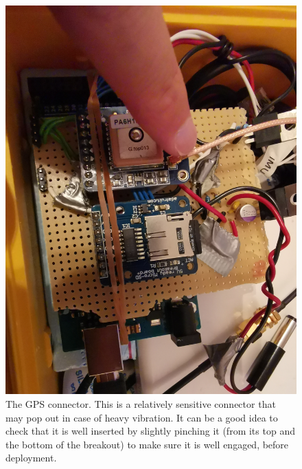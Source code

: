 \documentclass[pdftex,a4paper,12pt,twocolumn,fleqn,captions=tableheading]{scrartcl}
\begin{document}
  \begin{figure}
  \begin{center}
  \includegraphics[width=.8\textwidth]{Figures/gps_connector}
  \caption{The GPS connector. This is a relatively sensitive connector that may pop out in case of heavy vibration. It can be a good idea to check that it is well inserted by slightly pinching it (from its top and the bottom of the breakout) to make sure it is well engaged, before deployment.}
  \end{center}
  \end{figure}
\end{document}
